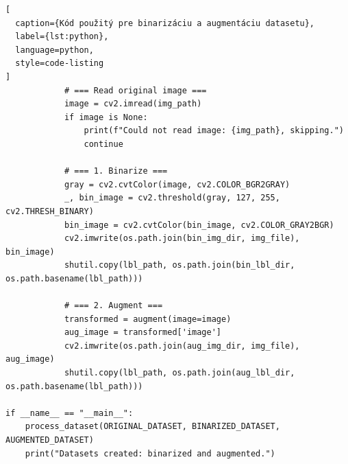 \begin{lstlisting}[
  caption={Kód použitý pre binarizáciu a augmentáciu datasetu},
  label={lst:python},
  language=python,
  style=code-listing
]
            # === Read original image ===
            image = cv2.imread(img_path)
            if image is None:
                print(f"Could not read image: {img_path}, skipping.")
                continue

            # === 1. Binarize ===
            gray = cv2.cvtColor(image, cv2.COLOR_BGR2GRAY)
            _, bin_image = cv2.threshold(gray, 127, 255, cv2.THRESH_BINARY)
            bin_image = cv2.cvtColor(bin_image, cv2.COLOR_GRAY2BGR)
            cv2.imwrite(os.path.join(bin_img_dir, img_file), bin_image)
            shutil.copy(lbl_path, os.path.join(bin_lbl_dir, os.path.basename(lbl_path)))

            # === 2. Augment ===
            transformed = augment(image=image)
            aug_image = transformed['image']
            cv2.imwrite(os.path.join(aug_img_dir, img_file), aug_image)
            shutil.copy(lbl_path, os.path.join(aug_lbl_dir, os.path.basename(lbl_path)))

if __name__ == "__main__":
    process_dataset(ORIGINAL_DATASET, BINARIZED_DATASET, AUGMENTED_DATASET)
    print("Datasets created: binarized and augmented.")

\end{lstlisting}
